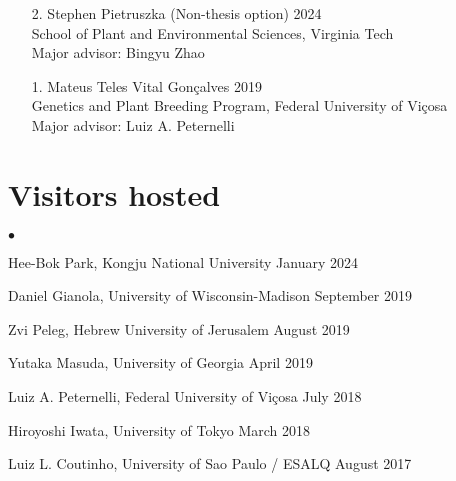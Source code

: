 \documentclass[margin,line,10pt]{res}
\newenvironment{list2}{
  \begin{list}{$\bullet$}{%
      \setlength{\itemsep}{0in}
      \setlength{\parsep}{0in} \setlength{\parskip}{0in}
      \setlength{\topsep}{0in} \setlength{\partopsep}{0in} 
      \setlength{\leftmargin}{0.2in}}}{\end{list}}
\begin{document}
\begin{resume}
\begin{enumerate}
  \item [2.] Stephen Pietruszka (Non-thesis option) \hfill 2024 \\
School of Plant and Environmental Sciences,  Virginia Tech \\
Major advisor: Bingyu Zhao

\vspace{0.3cm}

\item [1.] Mateus Teles Vital Gon\c calves  \hfill 2019 \\
  Genetics and Plant Breeding Program, Federal University of  Vi\c cosa\\
  Major advisor: Luiz A. Peternelli
\end{enumerate}


\vspace{0.5cm}
\section{\sc Visitors hosted}

\begin{list2}
\item Hee-Bok Park, Kongju National University  \hfill January 2024\\

\item Daniel Gianola, University of Wisconsin-Madison  \hfill September 2019\\

\item Zvi Peleg, Hebrew University of Jerusalem   \hfill August 2019\\

\item Yutaka Masuda, University of Georgia \hfill April 2019\\

\item Luiz A. Peternelli, Federal University of Vi\c cosa  \hfill July 2018\\

\item Hiroyoshi Iwata, University of Tokyo  \hfill March 2018\\
    
\item Luiz L. Coutinho, University of Sao Paulo / ESALQ  \hfill August 2017\\


\end{list2}













\end{resume}
\end{document}
